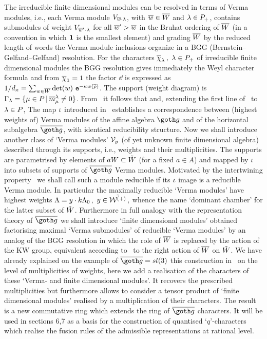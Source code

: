 The irreducible finite dimensional modules can be resolved in
terms of Verma modules, i.e., each Verma module
$V_{\overline w\cdot\lambda}$, with $\overline w\in\overline W$ and $\lambda\in P_+$, contains
submodules of weight $V_{\overline w'\cdot\lambda}$ for all $\overline w'>\overline w$ in
the Bruhat ordering of $\overline W$ (in a convention in which ${\bf 1}$ is
the smallest element) and grading $\overline W$ by the reduced length of
words the Verma module inclusions organize in a BGG
(Bernstein--Gelfand--Gelfand) resolution.  For the characters
$\overline{\chi}_\lambda\,,$ $\lambda\in P_+$ of irreducible finite dimensional
modules the BGG resolution gives immediately  the Weyl character
formula
%
\eqn\sfch{\eqalign{
  \bc_\zl
 = \sum_{\hw\in\bW} \det(\hw)\ \ch(\VM_{\hw\cdot\zl})& = 
 \dd\ 
 \sum_{\hw\in\bW} \det(\hw)\  \ts-,{\hw(\zl+\br)}
  = \sum_{\zm\in P
  } \bm^{\zl}_{\zm}\ \ts-,{\zm} \,,\cr
\bm^{\zl}_{\zm}& = \sum_{w\in\bW} \det(w)\ 
K_{w\cdot\zl - \zm}\,, 
}}
%
and from $\overline{\chi}_{{\bf 1}}=1$ the factor $\dd$ is expressed as
$1/\dd=\sum_{\hw\in\bW} \det(\hw)\  \ts-,{\hw(\br)}$.  The
support (weight diagram) is $\Gamma_{\lambda} =\{\mu\in P\,|\,
\overline{m}^{\lambda}_{\mu}\ne  0\}$.  {}From \sfch\ it follows that
%
\eqn\ginv{ 
w(\bc_\zl)=  \bc_\zl\,, \ 
\ \   \bm^{\zl}_{w(\zm)}=\bm^{\zl}_{\zm}\,,
}
%
 and,  extending the first line of \sfch\ to $\lambda\in P$, 
%
\eqn{} 
%
The map $\iota$ introduced in \Ib\ establishes a correspondence
between (highest weights of) Verma modules of the affine algebra
$\go$ and of the horizontal subalgebra $\bgo$, with identical
reducibility structure.  Now we shall introduce another class of
`Verma modules' ${\cal V}_y$ 
(of yet unknown finite dimensional algebra)
described through its supports, i.e., weights and their
multiplicities. The supports are parametrised by elements of $a W
\subset\tilde W$ (for a fixed $ a\in A$) and mapped by $\iota$ into
subsets of supports of  $\bgo$ Verma modules.  Motivated by  the
intertwining property \Ic\ we shall call such a module reducible
if its  $\iota$ image is a reducible Verma module. In particular
the maximally reducible `Verma modules' have highest weights
$\Lambda=y\cdot k\Lambda_0\,,$ $y\in \tilde{{\cal W}^{(+)}}\,,$ whence the name `dominant
chamber' for the latter subset of $\tilde W$.  Furthermore in full
analogy with the representation theory of $\bgo$ we shall
introduce `finite dimensional modules' obtained factorising
maximal  `Verma submodules' of reducible `Verma modules' by an
analog of the BGG resolution in which the role of $\overline W$ is
replaced by the action of the KW group, equivalent according to
\Ia\ to the right action of $\overline W$ on $\tilde W$. We have already
explained on the example of $\bgo=sl(3)$ this construction in
\FGP\ on the level of multiplicities of weights, here we add a
realisation of the characters of these `Verma- and finite
dimensional  modules'. It recovers the prescribed multiplicities
but furthermore allows to consider a tensor product of `finite
dimensional  modules' realised by a multiplication of their
characters. The result is a new commutative ring which extends
the  ring of $\bgo$ characters. It will be used in sections 6,7
as a basis for the construction of quantised  `$q$'-characters
which realise the fusion rules of the admissible representations 
at rational level.

